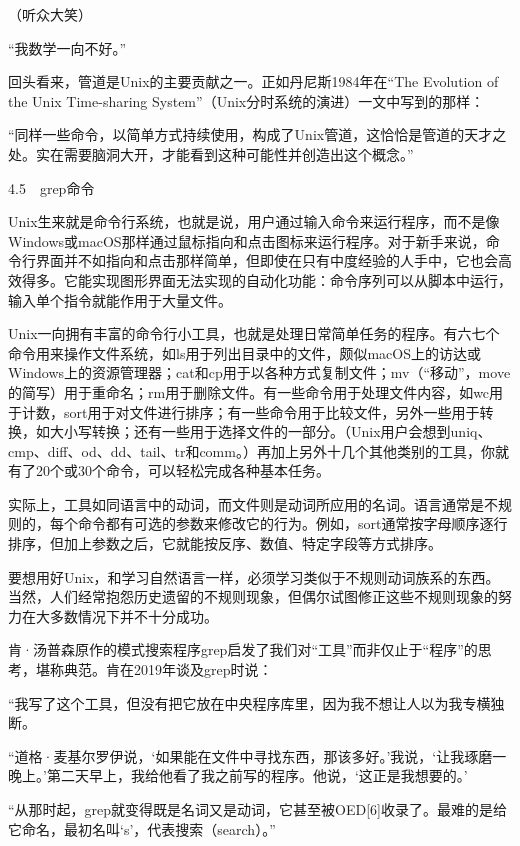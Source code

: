 \documentclass[a4paper,12pt,UTF8,twoside]{ctexbook}
\begin{document}
{（听众大笑）

“我数学一向不好。”



回头看来，管道是Unix的主要贡献之一。正如丹尼斯1984年在“The Evolution of the Unix Time-sharing System”（Unix分时系统的演进）一文中写到的那样：

“同样一些命令，以简单方式持续使用，构成了Unix管道，这恰恰是管道的天才之处。实在需要脑洞大开，才能看到这种可能性并创造出这个概念。”





4.5　grep命令


Unix生来就是命令行系统，也就是说，用户通过输入命令来运行程序，而不是像Windows或macOS那样通过鼠标指向和点击图标来运行程序。对于新手来说，命令行界面并不如指向和点击那样简单，但即使在只有中度经验的人手中，它也会高效得多。它能实现图形界面无法实现的自动化功能：命令序列可以从脚本中运行，输入单个指令就能作用于大量文件。

Unix一向拥有丰富的命令行小工具，也就是处理日常简单任务的程序。有六七个命令用来操作文件系统，如ls用于列出目录中的文件，颇似macOS上的访达或Windows上的资源管理器；cat和cp用于以各种方式复制文件；mv（“移动”，move的简写）用于重命名；rm用于删除文件。有一些命令用于处理文件内容，如wc用于计数，sort用于对文件进行排序；有一些命令用于比较文件，另外一些用于转换，如大小写转换；还有一些用于选择文件的一部分。（Unix用户会想到uniq、cmp、diff、od、dd、tail、tr和comm。）再加上另外十几个其他类别的工具，你就有了20个或30个命令，可以轻松完成各种基本任务。

实际上，工具如同语言中的动词，而文件则是动词所应用的名词。语言通常是不规则的，每个命令都有可选的参数来修改它的行为。例如，sort通常按字母顺序逐行排序，但加上参数之后，它就能按反序、数值、特定字段等方式排序。

要想用好Unix，和学习自然语言一样，必须学习类似于不规则动词族系的东西。当然，人们经常抱怨历史遗留的不规则现象，但偶尔试图修正这些不规则现象的努力在大多数情况下并不十分成功。

肯·汤普森原作的模式搜索程序grep启发了我们对“工具”而非仅止于“程序”的思考，堪称典范。肯在2019年谈及grep时说：

“我写了这个工具，但没有把它放在中央程序库里，因为我不想让人以为我专横独断。

“道格·麦基尔罗伊说，‘如果能在文件中寻找东西，那该多好。’我说，‘让我琢磨一晚上。’第二天早上，我给他看了我之前写的程序。他说，‘这正是我想要的。’

“从那时起，grep就变得既是名词又是动词，它甚至被OED[6]收录了。最难的是给它命名，最初名叫‘s’，代表搜索（search）。”



}
\end{document}
